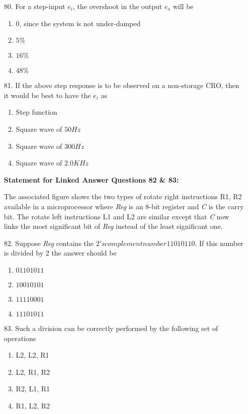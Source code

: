 \documentclass[journal,12pt,onecolumn]{IEEEtran}
\theoremstyle{remark}
\begin{document}
\begin{enumerate}
    \item [80.] For a step-input $e_i$, the overshoot in the output $e_o$ will be
    \begin{enumerate}
        \item $0$, since the system is not under-damped
        \item $5\%$
        \item $16\%$
        \item $48\%$
   \end{enumerate}

    \item [81.] If the above step response is to be observed on a non-storage CRO, then it would be best to have the $e_i$ as 
     \begin{enumerate}    
                \item Step function
                \item Square wave of $50 Hz$
                \item Square wave of $300 Hz$
                \item Square wave of $2.0 KHz$
        \end{enumerate} 
     
      
  \textbf{Statement for Linked Answer Questions 82 \& 83:}

The associated figure shows the two types of rotate right instructions R1, R2 available in a microprocessor where \textit{Reg} is an 8-bit register and \textit{C} is the carry bit. The rotate left instructions L1 and L2 are similar except that \textit{C} now links the most significant bit of \textit{Reg} instead of the least significant one.
\begin{figure}[H]
\centering
\resizebox{0.6\textwidth}{!}{}
\end{figure}



    \item [82.] Suppose \textit{Reg} contains the $2's complement number 11010110$. If this number is divided by 2 the answer should be
    \begin{enumerate}
        \item $01101011$
        \item $10010101$
        \item $11110001$
        \item $11101011$
    \end{enumerate}
    \item [83.] Such a division can be correctly performed by the following set of operations
    \begin{enumerate}[label=(\Alph*)]
        \item L2, L2, R1
        \item L2, R1, R2
        \item R2, L1, R1
        \item R1, L2, R2
    \end{enumerate}



\end{enumerate}
\end{document}
